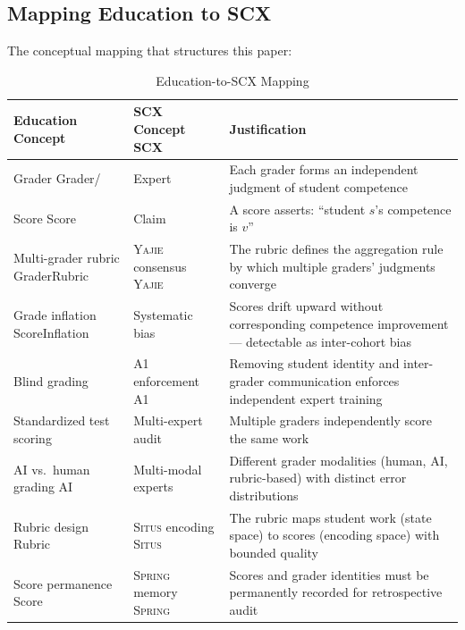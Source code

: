 \documentclass[11pt,a4paper]{article}
\theoremstyle{definition}
\theoremstyle{remark}
\newcommand{\Situs}{\textsc{Situs}}
\newcommand{\Yajie}{\textsc{Yajie}}
\newcommand{\Spring}{\textsc{Spring}}
\begin{document}
\subsection{Mapping Education to SCX}
The conceptual mapping that structures this paper:
\begin{table}[htbp]
\centering
\caption{Education-to-SCX Mapping}
\label{tab:mapping}
\begin{tabular}{p{4.5cm} p{4.5cm} p{4.5cm}}
\toprule
\textbf{Education Concept } & \textbf{SCX Concept SCX} & \textbf{Justification } \\
\midrule
Grader Grader/ & Expert  & Each grader forms an independent judgment of student competence \\
Score Score & Claim  & A score asserts: ``student $s$'s competence is $v$'' \\
Multi-grader rubric GraderRubric & \Yajie{} consensus \Yajie{} & The rubric defines the aggregation rule by which multiple graders' judgments converge \\
Grade inflation ScoreInflation & Systematic bias  & Scores drift upward without corresponding competence improvement — detectable as inter-cohort bias \\
Blind grading  & A1 enforcement A1 & Removing student identity and inter-grader communication enforces independent expert training \\
Standardized test scoring  & Multi-expert audit  & Multiple graders independently score the same work \\
AI vs.\ human grading AI & Multi-modal experts  & Different grader modalities (human, AI, rubric-based) with distinct error distributions \\
Rubric design Rubric & \Situs{} encoding \Situs{} & The rubric maps student work (state space) to scores (encoding space) with bounded quality \\
Score permanence Score & \Spring{} memory \Spring{} & Scores and grader identities must be permanently recorded for retrospective audit \\
\bottomrule
\end{tabular}
\end{table}
\end{document}
